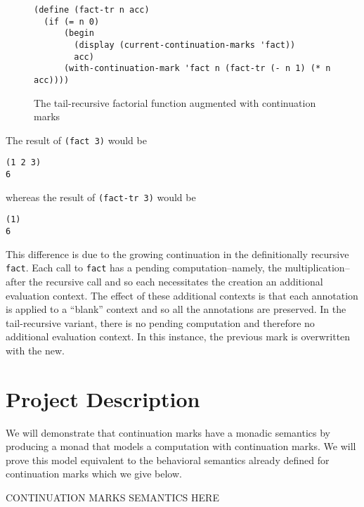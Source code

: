 \documentclass[ms]{byuprop}
\newcounter{definition}
\begin{document}
\begin{figure}
\label{fac-tail-rec-cm}
\begin{verbatim}
(define (fact-tr n acc)
  (if (= n 0)
      (begin
        (display (current-continuation-marks 'fact))
        acc)
      (with-continuation-mark 'fact n (fact-tr (- n 1) (* n acc))))
\end{verbatim}
\caption{The tail-recursive factorial function augmented with continuation marks}
\end{figure}

The result of \texttt{(fact 3)} would be

\begin{verbatim}
(1 2 3)
6
\end{verbatim}

whereas the result of \texttt{(fact-tr 3)} would be

\begin{verbatim}
(1)
6
\end{verbatim}

This difference is due to the growing continuation in the definitionally recursive
\texttt{fact}. Each call to \texttt{fact} has a pending computation--namely, the
multiplication--after the recursive call and so each necessitates the creation an
additional evaluation context. The effect of these additional contexts is that each
annotation is applied to a ``blank'' context and so all the annotations are preserved. In
the tail-recursive variant, there is no pending computation and therefore no additional
evaluation context. In this instance, the previous mark is overwritten with the new.




\section{Project Description}

We will demonstrate that continuation marks have a monadic semantics by producing a monad
that models a computation with continuation marks. We will prove  this model equivalent to
the behavioral semantics already defined for continuation marks which we give below.

CONTINUATION MARKS SEMANTICS HERE
\end{document}
